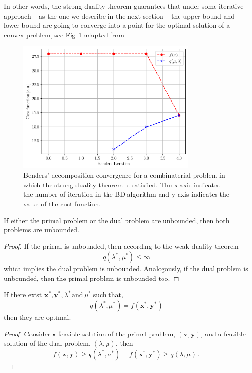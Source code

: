 In other words, the strong duality theorem guarantees that under some iterative approach -- as the one we describe in the next section -- the upper bound and lower bound are going to converge into a point for the optimal solution of a convex problem, see Fig.\,\ref{fig:BD_Convergence} adapted from\,\cite{Zhao2021HybridProgramming}.
\begin{figure}[H]
\centering
\includegraphics[width=0.8\textwidth]{Figures/BD_Convergence.pdf} 
\caption{Benders' decomposition convergence for a combinatorial problem in which the strong duality theorem is satisfied. The x-axis indicates the number of iteration in the BD algorithm and y-axis indicates the value of the cost function.}
\label{fig:BD_Convergence}
\end{figure}
\begin{corollary}{}{}
If either the primal problem or the dual problem are unbounded, then both problems are unbounded.
\end{corollary}
\begin{proof}
If the primal is unbounded, then according to the weak duality theorem
\begin{equation}
    q(\lambda^{*}, \mu^{*}) \leq \infty
\end{equation}
which implies the dual problem is unbounded. Analogously, if the dual problem is unbounded, then the primal problem is unbounded too.
\end{proof}
\begin{corollary}{}{}
If there exist $\mathbf{x}^{*}, \mathbf{y}^{*},\lambda^{*}\,\textrm{and}\, \mu^{*}$ such that,
\begin{equation}
    q(\lambda^{*}, \mu^{*}) = f(\mathbf{x}^{*}, \mathbf{y}^{*})
\end{equation}
then they are optimal.
\end{corollary}
\begin{proof}
Consider a feasible solution of the primal problem, $(\mathbf{x}, \mathbf{y})$, and a feasible solution of the dual problem, $(\lambda, \mu)$, then
\begin{equation}
    f(\mathbf{x}, \mathbf{y}) \geq q(\lambda^{*}, \mu^{*}) = f(\mathbf{x}^{*}, \mathbf{y}^{*}) \geq q(\lambda, \mu)\ .
\end{equation}
\end{proof}
